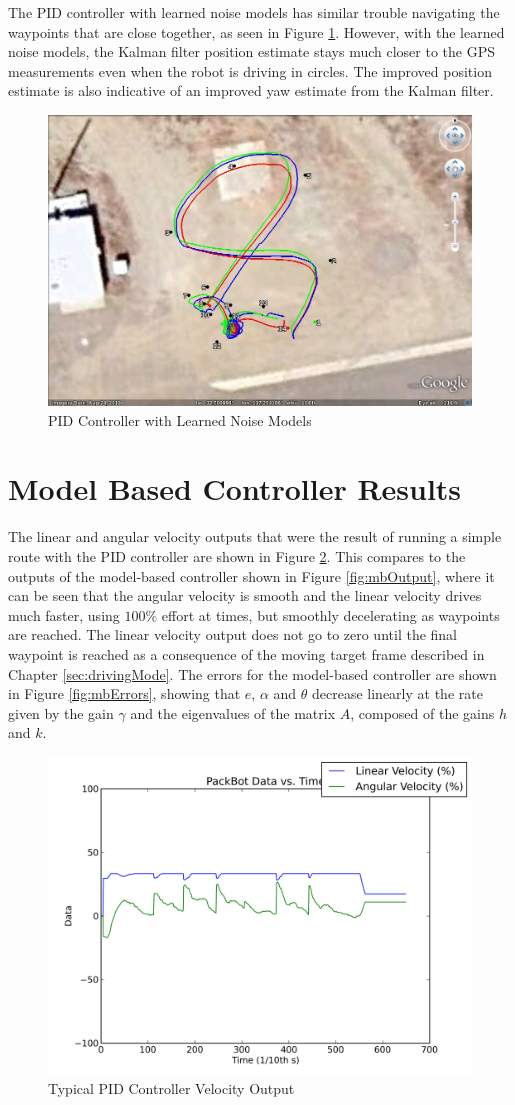 The PID controller with learned noise models has similar trouble navigating the waypoints that are close together, as seen in Figure \ref{fig:kfResults4}. However, with the learned noise models, the Kalman filter position estimate stays much closer to the GPS measurements even when the robot is driving in circles. The improved position estimate is also indicative of an improved yaw estimate from the Kalman filter.

\begin{figure}[ht!]
	\centering
	\includegraphics[width=.75\textwidth]{images/GE/20101203_1751_kf_pidNewQR}
	\caption{PID Controller with Learned Noise Models}
	\label{fig:kfResults4}
\end{figure}

\section{Model Based Controller Results}
\label{sec:lyapunovResults}
The linear and angular velocity outputs that were the result of running a simple route with the PID controller are shown in Figure \ref{fig:pidOutput}. This compares to the outputs of the model-based controller shown in Figure \ref{fig:mbOutput}, where it can be seen that the angular velocity is smooth and the linear velocity drives much faster, using $100\%$ effort at times, but smoothly decelerating as waypoints are reached. The linear velocity output does not go to zero until the final waypoint is reached as a consequence of the moving target frame described in Chapter \ref{sec:drivingMode}. The errors for the model-based controller are shown in Figure \ref{fig:mbErrors}, showing that $e$, $\alpha$ and $\theta$ decrease linearly at the rate given by the gain $\gamma$ and the eigenvalues of the matrix $A$, composed of the gains $h$ and $k$.

\begin{figure}[ht!]
	\centering
	\includegraphics[width=.5\textwidth]{images/pbtx/20110109_1815_pbtx_simpleDrivePID}
	\caption{Typical PID Controller Velocity Output}
	\label{fig:pidOutput}
\end{figure}

